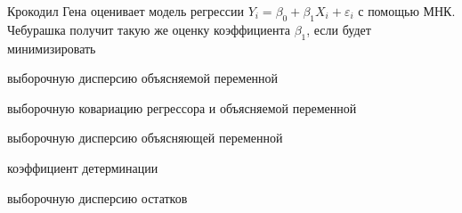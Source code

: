 
\begin{question}
Крокодил Гена оценивает модель регрессии
\(Y_i = \beta_0 + \beta_1 X_i + \varepsilon_i\) с помощью МНК. Чебурашка
получит такую же оценку коэффициента \(\beta_1\), если будет
минимизировать
\begin{answerlist}
  \item выборочную дисперсию объясняемой переменной
  \item выборочную ковариацию регрессора и объясняемой переменной
  \item выборочную дисперсию объясняющей переменной
  \item коэффициент детерминации
  \item выборочную дисперсию остатков
\end{answerlist}
\end{question}


